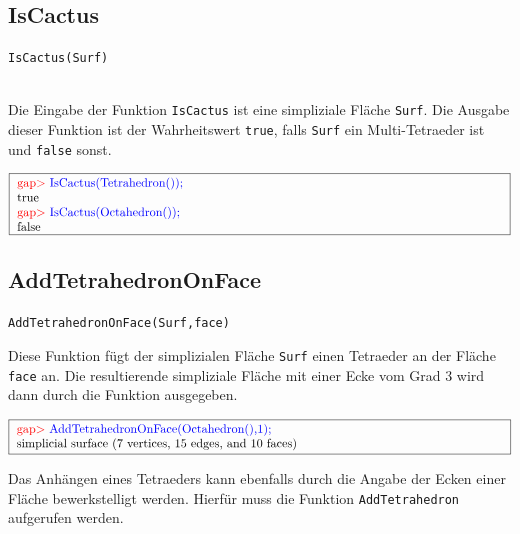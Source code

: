 \documentclass[12pt,titlepage,twoside,cleardoublepage]{article}
\theoremstyle{nummermitklammern}
\numberwithin{equation}{section}
\begin{document}
\subsection{IsCactus}
\begin{large}
\texttt{IsCactus(Surf)}
\end{large}\\
Die Eingabe der Funktion \texttt{IsCactus} ist eine simpliziale Fläche \texttt{Surf}. Die Ausgabe dieser Funktion ist der Wahrheitswert \texttt{true}, falls \texttt{Surf} ein Multi-Tetraeder ist und \texttt{false} sonst. 
\begin{center}
$\fbox{
\parbox{14cm}{
\textcolor{red}{gap$>$} \textcolor{blue}{IsCactus(Tetrahedron());}\newline
true\newline
\textcolor{red}{gap$>$} \textcolor{blue}{IsCactus(Octahedron());}\newline
false
}
}$


\end{center}

\subsection{AddTetrahedronOnFace}
\begin{large}
\texttt{AddTetrahedronOnFace(Surf,face)}
\end{large}
Diese Funktion fügt der  simplizialen Fläche \texttt{Surf} einen Tetraeder an der Fläche \texttt{face} an. Die resultierende simpliziale Fläche mit einer Ecke vom Grad 3 wird dann durch die Funktion ausgegeben.
\begin{center}
$\fbox{
\parbox{14cm}{
\textcolor{red}{gap$>$} \textcolor{blue}{AddTetrahedronOnFace(Octahedron(),1);}\newline
simplicial surface (7 vertices, 15 edges, and 10 faces)
}
}$
\end{center}
Das Anhängen eines Tetraeders kann ebenfalls durch die Angabe der Ecken einer Fläche bewerkstelligt werden. Hierfür muss die Funktion \texttt{AddTetrahedron} aufgerufen werden.
\end{document}
